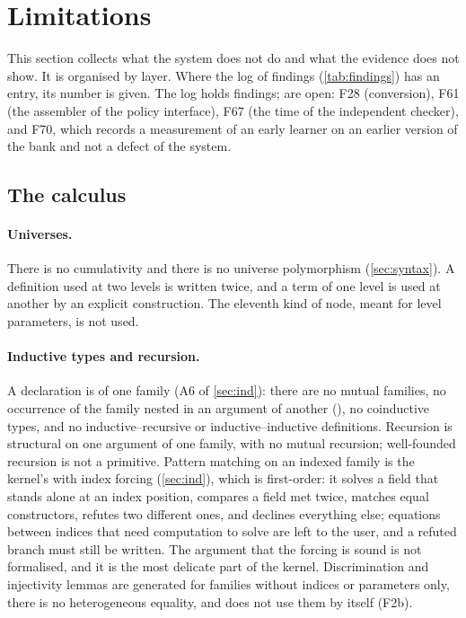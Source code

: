 \section{Limitations}\label{sec:limits}

This section collects what the system does not do and what the evidence does not show.
It is organised by layer.
Where the log of findings (\cref{tab:findings}) has an entry, its number is given.
The log holds \findNumbers{} findings; \findOpen{} are open: F28 (conversion), F61 (the assembler of the policy interface), F67 (the time of the independent checker), and F70, which records a measurement of an early learner on an earlier version of the bank and not a defect of the system.

\subsection{The calculus}

\paragraph{Universes.}
There is no cumulativity and there is no universe polymorphism (\cref{sec:syntax}).
A definition used at two levels is written twice, and a term of one level is used at another by an explicit construction.
The eleventh kind of node, meant for level parameters, is not used.

\paragraph{Inductive types and recursion.}
A declaration is of one family (A6 of \cref{sec:ind}): there are no mutual families, no occurrence of the family nested in an argument of another (), no coinductive types, and no inductive--recursive or inductive--inductive definitions.
Recursion is structural on one argument of one family, with no mutual recursion; well-founded recursion is not a primitive.
Pattern matching on an indexed family is the kernel's  with index forcing (\cref{sec:ind}), which is first-order: it solves a field that stands alone at an index position, compares a field met twice, matches equal constructors, refutes two different ones, and declines everything else; equations between indices that need computation to solve are left to the user, and a refuted branch must still be written.
The argument that the forcing is sound is not formalised, and it is the most delicate part of the kernel.
Discrimination and injectivity lemmas are generated for families without indices or parameters only, there is no heterogeneous equality, and  does not use them by itself (F2b).

